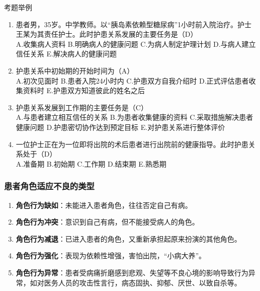 \documentclass[11pt, a4paper]{ctexart}
\begin{document}
\begin{examplebox}{考题举例}
\begin{enumerate}
    \item 患者男，35岁。中学教师。以“胰岛素依赖型糖尿病”1小时前入院治疗。护士王某为其责任护士。此时护患关系发展的主要任务是（D）\\
    A.收集病人资料 \quad B.明确病人的健康问题 \quad C.为病人制定护理计划 \quad D.与病人建立信任关系 \quad E.解决病人的健康问题
    \item 护患关系中初始期的开始时间为（A）\\
    A.初次见面时 \quad B.患者入院24小时内 \quad C.护患双方自我介绍时 \quad D.正式评估患者收集资料时 \quad E.护患双方知道彼此的姓名之后
    \item 护患关系发展到工作期的主要任务是（C）\\
    A.与患者建立相互信任的关系 \quad B.为患者收集健康的资料 \quad C.采取措施解决患者健康问题 \quad D.护患密切协作达到预定目标 \quad E.对护患关系进行整体评价
    \item 一位护士正在为一位即将出院的术后患者进行出院前的健康指导。此时护患关系处于（D）\\
    A.准备期 \quad B.初始期 \quad C.工作期 \quad D.结束期 \quad E.熟悉期
\end{enumerate}
\end{examplebox}

\subsubsection{患者角色适应不良的类型}
\begin{enumerate}
    \item \textbf{角色行为缺如}：未能进入患者角色，往往否定自己有病。
    \item \textbf{角色行为冲突}：意识到自己有病，但不能接受病人的角色。
    \item \textbf{角色行为减退}：已进入患者的角色，又重新承担起原来扮演的其他角色。
    \item \textbf{角色行为强化}：表现为依赖性增强，害怕出院，“小病大养”。
    \item \textbf{角色行为异常}：患者受病痛折磨感到悲观、失望等不良心境的影响导致行为异常，如对医务人员的攻击性言行，病态固执、抑郁、厌世、以致自杀等。
\end{enumerate}
\end{document}
